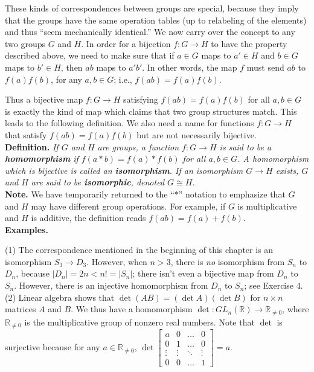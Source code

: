 \documentclass[leqno]{book}
\begin{document}
These kinds of correspondences between groups are special, because they imply that the groups have the same operation tables (up to relabeling of the elements) and thus ``seem mechanically identical.''  We now carry over the concept to any two groups $G$ and $H$.  In order for a bijection $f:G\to H$ to have the property described above, we need to make sure that if $a\in G$ maps to $a'\in H$ and $b\in G$ maps to $b'\in H$, then $ab$ maps to $a'b'$.  In other words, the map $f$ must send $ab$ to $f(a)f(b)$, for any $a,b\in G$; i.e., $f(ab)=f(a)f(b)$.

Thus a bijective map $f:G\to H$ satisfying $f(ab)=f(a)f(b)$ for all $a,b\in G$ is exactly the kind of map which claims that two group structures match.  This leads to the following definition.  We also need a name for functions $f:G\to H$ that satisfy $f(ab)=f(a)f(b)$ but are not necessarily bijective.\\

\noindent\textbf{Definition.} \emph{If $G$ and $H$ are groups, a function $f:G\to H$ is said to be a \textbf{homomorphism} if $f(a*b)=f(a)*f(b)$ for all $a,b\in G$.  A homomorphism which is bijective is called an \textbf{isomorphism}.  If an isomorphism $G\to H$ exists, $G$ and $H$ are said to be \textbf{isomorphic}, denoted $G\cong H$.}\\

\noindent\textbf{Note.} We have temporarily returned to the ``$*$'' notation to emphasize that $G$ and $H$ may have different group operations.  For example, if $G$ is multiplicative and $H$ is additive, the definition reads $f(ab)=f(a)+f(b)$.\\

\noindent\textbf{Examples.}

(1) The correspondence mentioned in the beginning of this chapter is an isomorphism $S_3\to D_3$.  However, when $n>3$, there is \emph{no} isomorphism from $S_n$ to $D_n$, because $|D_n|=2n<n!=|S_n|$; there isn't even a bijective map from $D_n$ to $S_n$.  However, there is an injective homomorphism from $D_n$ to $S_n$; see Exercise 4.\\

(2) Linear algebra shows that $\det(AB)=(\det A)(\det B)$ for $n\times n$ matrices $A$ and $B$.  We thus have a homomorphism $\det:GL_n(\mathbb R)\to\mathbb R_{\ne 0}$, where $\mathbb R_{\ne 0}$ is the multiplicative group of nonzero real numbers.  Note that $\det$ is surjective because for any $a\in\mathbb R_{\ne 0}$, $\det\begin{bmatrix}a&0&\dots&0\\0&1&\dots&0\\\vdots&\vdots&\ddots&\vdots\\0&0&\dots&1\end{bmatrix}=a$.\\
\end{document}
